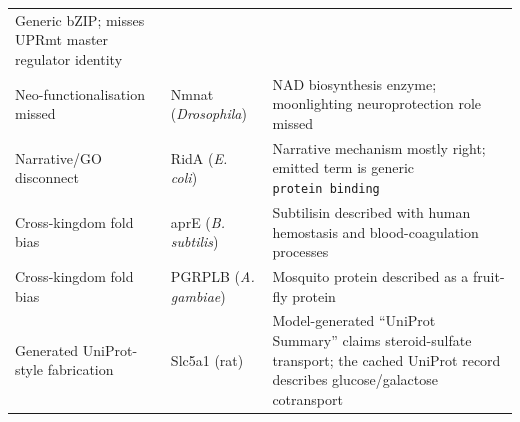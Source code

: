 \documentclass[
  11pt,
]{article}
\begin{document}
\begin{longtable}[]{@{}lll@{}}
\begin{minipage}[t]{0.30\columnwidth}
Generic bZIP; misses UPRmt master regulator identity\strut
\end{minipage}\tabularnewline
\begin{minipage}[t]{0.30\columnwidth}\raggedright
Neo-functionalisation missed\strut
\end{minipage} & \begin{minipage}[t]{0.30\columnwidth}\raggedright
Nmnat (\emph{Drosophila})\strut
\end{minipage} & \begin{minipage}[t]{0.30\columnwidth}\raggedright
NAD biosynthesis enzyme; moonlighting neuroprotection role missed\strut
\end{minipage}\tabularnewline
\begin{minipage}[t]{0.30\columnwidth}\raggedright
Narrative/GO disconnect\strut
\end{minipage} & \begin{minipage}[t]{0.30\columnwidth}\raggedright
RidA (\emph{E. coli})\strut
\end{minipage} & \begin{minipage}[t]{0.30\columnwidth}\raggedright
Narrative mechanism mostly right; emitted term is generic
\texttt{protein\ binding}\strut
\end{minipage}\tabularnewline
\begin{minipage}[t]{0.30\columnwidth}\raggedright
Cross-kingdom fold bias\strut
\end{minipage} & \begin{minipage}[t]{0.30\columnwidth}\raggedright
aprE (\emph{B. subtilis})\strut
\end{minipage} & \begin{minipage}[t]{0.30\columnwidth}\raggedright
Subtilisin described with human hemostasis and blood-coagulation
processes\strut
\end{minipage}\tabularnewline
\begin{minipage}[t]{0.30\columnwidth}\raggedright
Cross-kingdom fold bias\strut
\end{minipage} & \begin{minipage}[t]{0.30\columnwidth}\raggedright
PGRPLB (\emph{A. gambiae})\strut
\end{minipage} & \begin{minipage}[t]{0.30\columnwidth}\raggedright
Mosquito protein described as a fruit-fly protein\strut
\end{minipage}\tabularnewline
\begin{minipage}[t]{0.30\columnwidth}\raggedright
Generated UniProt-style fabrication\strut
\end{minipage} & \begin{minipage}[t]{0.30\columnwidth}\raggedright
Slc5a1 (rat)\strut
\end{minipage} & \begin{minipage}[t]{0.30\columnwidth}\raggedright
Model-generated ``UniProt Summary'' claims steroid-sulfate transport;
the cached UniProt record describes glucose/galactose cotransport\strut
\end{minipage}\tabularnewline
\bottomrule
\end{longtable}
\end{document}
